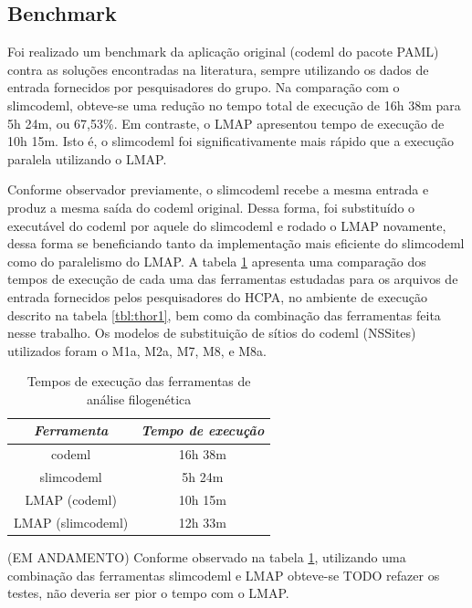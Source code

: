 \documentclass[cic,tc]{iiufrgs}
\begin{document}
\subsection{Benchmark}

Foi realizado um benchmark da aplicação original (codeml do pacote PAML) contra
as soluções encontradas na literatura, sempre utilizando os dados de entrada
fornecidos por pesquisadores do grupo. Na comparação com o slimcodeml,
obteve-se uma redução no tempo total de execução de 16h 38m para 5h 24m, ou
67,53\%. Em contraste, o LMAP apresentou tempo de execução de 10h 15m. Isto é,
o slimcodeml foi significativamente mais rápido que a execução paralela
utilizando o LMAP.

Conforme observador previamente, o slimcodeml recebe a mesma entrada e produz a
mesma saída do codeml original. Dessa forma, foi substituído o executável do
codeml por aquele do slimcodeml e rodado o LMAP novamente, dessa forma se
beneficiando tanto da implementação mais eficiente do slimcodeml como do
paralelismo do LMAP. A tabela \ref{tbl:paml} apresenta uma comparação dos
tempos de execução de cada uma das ferramentas estudadas para os arquivos de
entrada fornecidos pelos pesquisadores do HCPA, no ambiente de execução
descrito na tabela \ref{tbl:thor1}, bem como da combinação das ferramentas
feita nesse trabalho. Os modelos de substituição de sítios do codeml (NSSites)
utilizados foram o M1a, M2a, M7, M8, e M8a.

\begin{table}[h]
    \caption{Tempos de execução das ferramentas de análise filogenética}
    \centering
        \begin{tabular}{c|c}
          \hline
          \textit{Ferramenta}  &   \textit{Tempo de execução} \\
          \hline
          \hline
          codeml & 16h 38m \\
          slimcodeml & 5h 24m \\
          LMAP (codeml) & 10h 15m \\
          LMAP (slimcodeml) & 12h 33m \\
          \hline
        \end{tabular}
    \label{tbl:paml}
\end{table}

(EM ANDAMENTO) Conforme observado na tabela \ref{tbl:paml}, utilizando uma combinação das
ferramentas slimcodeml e LMAP obteve-se TODO refazer os testes, não deveria
ser pior o tempo com o LMAP.
\end{document}
